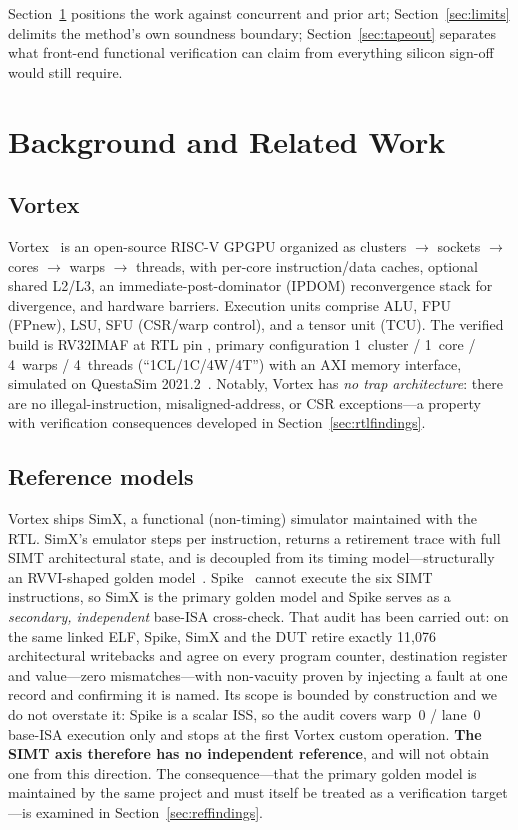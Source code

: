 \documentclass[conference]{IEEEtran}
\newcommand{\code}[1]{\texttt{\detokenize{#1}}}
\begin{document}
Section~\ref{sec:positioning} positions the work against concurrent and
prior art; Section~\ref{sec:limits} delimits the method's own soundness
boundary; Section~\ref{sec:tapeout} separates what front-end functional
verification can claim from everything silicon sign-off would still
require.

\section{Background and Related Work}
\label{sec:positioning}

\subsection{Vortex}
Vortex~\cite{vortex-micro, vortex-carrv} is an open-source RISC-V GPGPU
organized as clusters $\to$ sockets $\to$ cores $\to$ warps $\to$
threads, with per-core instruction/data caches, optional shared L2/L3,
an immediate-post-dominator (IPDOM) reconvergence stack for divergence,
and hardware barriers. Execution units comprise ALU, FPU (FPnew), LSU,
SFU (CSR/warp control), and a tensor unit (TCU). The verified build is
RV32IMAF at RTL pin \code{7a52ee5}, primary configuration 1~cluster /
1~core / 4~warps / 4~threads (``1CL/1C/4W/4T'') with an AXI memory
interface, simulated on QuestaSim 2021.2~\cite{questa}. Notably, Vortex has \emph{no
	trap architecture}: there are no illegal-instruction, misaligned-address,
or CSR exceptions---a property with verification consequences developed
in Section~\ref{sec:rtlfindings}.

\subsection{Reference models}
Vortex ships SimX, a functional (non-timing) simulator maintained with
the RTL. SimX's emulator steps per instruction, returns a retirement
trace with full SIMT architectural state, and is decoupled from its
timing model---structurally an RVVI-shaped golden model~\cite{rvvi}.
Spike~\cite{spike} cannot execute the six SIMT instructions, so SimX is
the primary golden model and Spike serves as a \emph{secondary,
	independent} base-ISA cross-check. That audit has been carried out: on
the same linked ELF, Spike, SimX and the DUT retire exactly 11{,}076
architectural writebacks and agree on every program counter, destination
register and value---zero mismatches---with non-vacuity proven by
injecting a fault at one record and confirming it is named. Its scope is
bounded by construction and we do not overstate it: Spike is a scalar
ISS, so the audit covers warp~0 / lane~0 base-ISA execution only and
stops at the first Vortex custom operation. \textbf{The SIMT axis
	therefore has no independent reference}, and will not obtain one from
this direction. The consequence---that the primary golden model is
maintained by the same project and must itself be treated as a
verification target---is examined in Section~\ref{sec:reffindings}.
\end{document}
